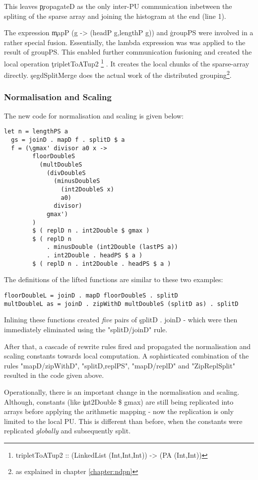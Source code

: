       This leaves \c{propagateD} as the only inter-PU communication inbetween the spliting of the
      sparse array and joining the histogram at the end (line 1).
      
      The expression \c{mapP (\lam g -> (headP g,lengthP g))} and \c{groupPS}
      were involved in a rather special fusion. Essentially, the lambda expression was
      was applied to the result of groupPS. This enabled further communication
      fusioning and created the local operation \c{tripletToATup2}
      \footnote{tripletToATup2 :: (LinkedList (Int,Int,Int)) -> (PA (Int,Int))}
      . It creates the
      local chunks of the sparse-array directly. \c{segdSplitMerge} does the
      actual work of the distributed grouping\footnote{as explained in chapter \ref{chapter:ndpn}}.
      
    \subsubsection{Normalisation and Scaling}
    The new code for normalisation and scaling is given below:
    \begin{lstlisting}
let n = lengthPS a
  gs = joinD . mapD f . splitD $ a
  f = (\gmax' divisor a0 x ->
        floorDoubleS
          (multDoubleS
            (divDoubleS
              (minusDoubleS
                (int2DoubleS x)
                a0)
              divisor)
            gmax')
        )
        $ ( replD n . int2Double $ gmax )
        $ ( replD n
            . minusDouble (int2Double (lastPS a))
            . int2Double . headPS $ a )
        $ ( replD n . int2Double . headPS $ a )
    \end{lstlisting}
    The definitions of the lifted functions are similar to these two examples:
    \begin{lstlisting}
floorDoubleL = joinD . mapD floorDoubleS . splitD
multDoubleL as = joinD . zipWithD multDoubleS (splitD as) . splitD
    \end{lstlisting}
    Inlining these functions created \emph{five} pairs of \c{splitD . joinD} - which were then immediately
    eliminated using the "splitD/joinD" rule.
    
    After that, a cascade of rewrite rules fired and propagated the normalisation and scaling
    constants towards local computation. A sophisticated combination of the rules
    "mapD/zipWithD", "splitD,replPS", "mapD/replD" and "ZipReplSplit" resulted in
    the code given above.
    
    Operationally, there is an important change in the normalisation and scaling.
    Although, constants (like \c{int2Double \$ gmax}) are still being replicated into arrays
    before applying the arithmetic mapping - now the replication
    is only limited to the local PU. This is different than before, when
    the constants were replicated \emph{globally} and subsequently split.
    
